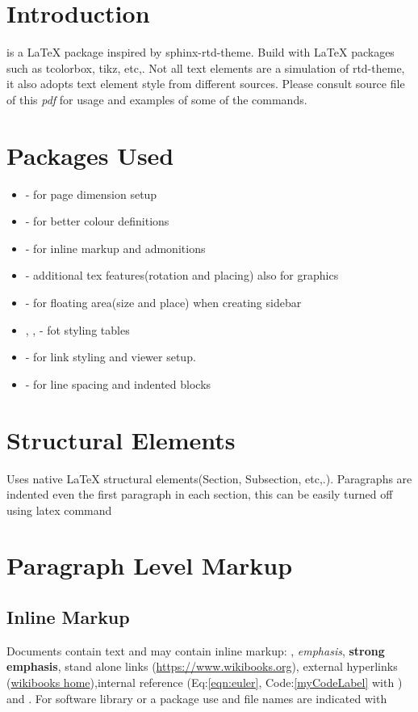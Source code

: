 \documentclass[12pt,a4paper]{report}
\begin{document}
\tableofcontents

\section{Introduction}
 is a {\LaTeX} package inspired by sphinx-rtd-theme. Build with {\LaTeX} packages such as tcolorbox, tikz, etc,. Not all text elements are a simulation of rtd-theme, it also adopts text element style from different sources. Please consult  source file of this \emph{pdf} for usage and examples of some of the commands.
\section{Packages Used}
\begin{itemize}
	\item {} - for page dimension setup
	\item {} - for better colour definitions
	\item {} - for inline markup and admonitions
	\item {} - additional tex features(rotation and placing) also for graphics
	\item {} - for floating area(size and place) when creating sidebar
	\item {}, ,  - fot styling tables
	\item {} - for link styling and viewer setup.
	\item {} - for line spacing and indented blocks
\end{itemize}

\section{Structural Elements}
Uses native LaTeX structural elements(Section, Subsection, etc,.). Paragraphs are indented even the first paragraph in each section, this can be easily turned off using  latex command
\section{Paragraph Level Markup}

\subsection{Inline Markup}
Documents contain text and may contain inline markup: , \emph{emphasis}, \textbf{strong emphasis}, stand alone links (\url{https://www.wikibooks.org}), external hyperlinks (\href{https://www.wikibooks.org}{wikibooks home}),internal reference (Eq:\ref{eqn:euler}, Code:\ref{myCodeLabel} with ) and . For software library or a package use  and file names are indicated with 
\end{document}
